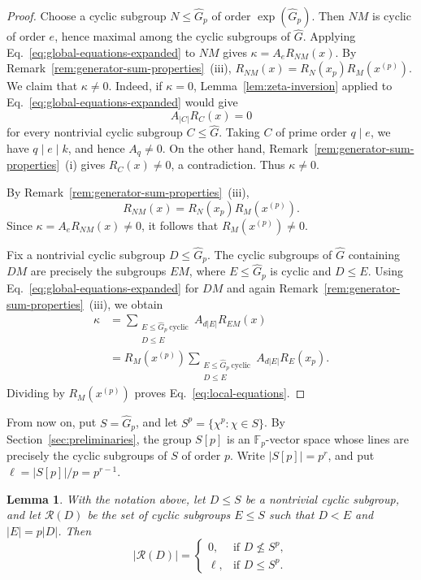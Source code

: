 \documentclass[11pt]{article}
\newtheorem{lemma}[theorem]{Lemma}
\theoremstyle{definition}
\begin{document}
\begin{proof}
	Choose a cyclic subgroup \(N\le\widehat G_p\) of order \(\exp(\widehat G_p)\). Then \(NM\) is cyclic of order \(e\), hence maximal among the cyclic subgroups of \(\widehat G\). Applying Eq.~\eqref{eq:global-equations-expanded} to \(NM\) gives $\kappa=A_eR_{NM}(x)$. By Remark~\ref{rem:generator-sum-properties}~(iii), \(R_{NM}(x)=R_N(x_p)R_M(x^{(p)})\). We claim that $\kappa\ne0$. Indeed, if $\kappa=0$, Lemma~\ref{lem:zeta-inversion} applied to Eq.~\eqref{eq:global-equations-expanded} would give
	$$
	A_{|C|}R_C(x)=0
	$$
	for every nontrivial cyclic subgroup $C\le\widehat G$. Taking $C$ of prime order $q\mid e$, we have $q\mid e\mid k$, and hence $A_q\ne0$. On the other hand, Remark~\ref{rem:generator-sum-properties}~(i) gives $R_C(x)\ne0$, a contradiction. Thus $\kappa\ne0$.
	
	By Remark~\ref{rem:generator-sum-properties}~(iii),
	$$
	R_{NM}(x)=R_N(x_p)R_M(x^{(p)}).
	$$
	Since $\kappa=A_eR_{NM}(x)\ne0$, it follows that $R_M(x^{(p)})\ne0$.  
	
	Fix a nontrivial cyclic subgroup \(D\le \widehat G_p\).  The cyclic
	subgroups of \(\widehat G\) containing \(DM\) are precisely the subgroups
	\(EM\), where \(E\le \widehat G_p\) is cyclic and \(D\le E\). Using Eq.~\eqref{eq:global-equations-expanded} for \(DM\) and again
	Remark~\ref{rem:generator-sum-properties}~(iii), we obtain
	\[
	\begin{aligned}
		\kappa
		&=
		\sum_{\substack{E\le \widehat G_p\ \mathrm{cyclic}\\D\le E}}
		A_{d|E|}R_{EM}(x)                                      \\
		&=
		R_M(x^{(p)})
		\sum_{\substack{E\le \widehat G_p\ \mathrm{cyclic}\\D\le E}}
		A_{d|E|}R_E(x_p).
	\end{aligned}
	\]
	Dividing by \(R_M(x^{(p)})\) proves Eq.~\eqref{eq:local-equations}.
\end{proof}



From now on, put \(S=\widehat G_p\), and let $S^p=\{\chi^p:\chi\in S\}$. By Section~\ref{sec:preliminaries}, the group \(S[p]\) is an \(\mathbb F_p\)-vector space whose lines are precisely the cyclic subgroups of \(S\) of order \(p\). Write \(|S[p]|=p^r\), and put \(\ell=|S[p]|/p=p^{r-1}\).

\begin{lemma}\label{lem:root-count}
	With the notation above, let \(D\le S\) be a nontrivial cyclic subgroup, and let \(\mathcal R(D)\) be the set of cyclic subgroups \(E\le S\) such that \(D<E\) and \(|E|=p|D|\). Then
	\[
	|\mathcal R(D)|
	=
	\begin{cases}
		0, & \text{if }D\nleq S^p,\\
		\ell, & \text{if }D\le S^p.
	\end{cases}
	\]
\end{lemma}
\end{document}
